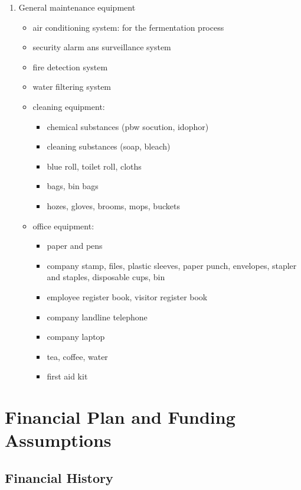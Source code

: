 \documentclass[11pt]{article}
\begin{document}
\begin{enumerate}
    \item General maintenance equipment
      \begin{itemize}
      \item air conditioning system: for the fermentation process
      \item security alarm ans surveillance system
      \item fire detection system
      \item water filtering system
      \item cleaning equipment:
        \begin{itemize}
        \item chemical substances (pbw socution, idophor)
        \item cleaning substances (soap, bleach)
        \item blue roll, toilet roll, cloths
        \item bags, bin bags
        \item hozes, gloves, brooms, mops, buckets
        \end{itemize}
      \item office equipment:
        \begin{itemize}
        \item paper and pens
        \item company stamp, files, plastic sleeves, paper punch, envelopes, stapler and staples, disposable cups, bin
        \item employee register book, visitor register book
        \item company landline telephone
        \item company laptop
        \item tea, coffee, water
        \item first aid kit
        \end{itemize}
      \end{itemize}
    \end{enumerate}
\newpage
\section{Financial Plan and Funding Assumptions}
  \subsection{Financial History}
\end{document}
